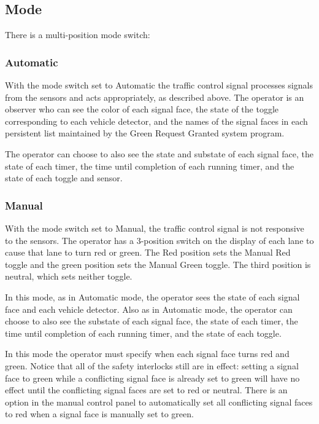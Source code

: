 \documentclass[letterpaper,twoside]{article}
\begin{document}
\subsection{Mode}

There is a multi-position mode switch:

\subsubsection{Automatic}

With the mode switch set to Automatic the traffic control signal
processes signals from the sensors and acts appropriately, as described
above.  The operator is an observer who can see the color of each
signal face, the state of the toggle corresponding to each vehicle detector,
and the names of the signal faces in each persistent list maintained by
the Green Request Granted system program.

The operator can choose to also see the state and substate of each signal
face, the state of each timer, the time until completion of each
running timer, and the state of each toggle and sensor.

\subsubsection{Manual}

With the mode switch set to Manual, the traffic control signal is
not responsive to the sensors.  The operator has
a 3-position switch on the display of each lane to cause that lane to turn red
or green.  The Red position sets the Manual
Red toggle and the green position sets the Manual Green toggle.
The third position is neutral, which sets neither toggle.

In this mode, as in Automatic mode, the operator sees the state of
each signal face and each vehicle detector.  Also as in Automatic mode,
the operator can choose to also see the substate of each signal face,
the state of each timer, the time until completion of each running
timer, and the state of each toggle.

In this mode the operator must specify when each signal face turns
red and green.  Notice that all of the safety interlocks still
are in effect: setting a signal face to green while a conflicting
signal face is already set to green will have no effect until the
conflicting signal faces are set to red or neutral.  There is an
option in the manual control panel to automatically set all
conflicting signal faces to red when a signal face is manually set to green.
\end{document}
